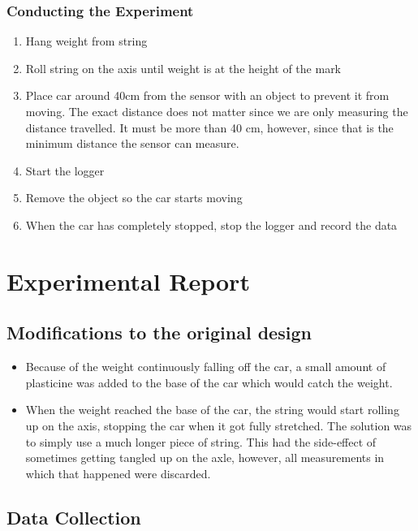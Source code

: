 \documentclass[titlepage,12pt]{article}
\begin{document}
\subsubsection{Conducting the Experiment}

\begin{enumerate}
    \item Hang weight from string
    \item Roll string on the axis until weight is at the height of the mark
    \item Place car around 40cm from the sensor with an object to prevent it from moving.
        The exact distance does not matter since we are only measuring the distance
        travelled. It must be more than 40 cm, however, since that is the minimum distance
        the sensor can measure.  
    \item Start the logger
    \item Remove the object so the car starts moving
    \item When the car has completely stopped, stop the logger and record the data
\end{enumerate}

\section{Experimental Report}

\subsection{Modifications to the original design}

\begin{itemize}
    \item Because of the weight continuously falling off the car, a small amount of
        plasticine was added to the base of the car which would catch the weight.

    \item When the weight reached the base of the car, the string would start rolling up on
        the axis, stopping the car when it got fully stretched. The solution was to simply
        use a much longer piece of string. This had the side-effect of sometimes getting
        tangled up on the axle, however, all measurements in which that happened were
        discarded.
\end{itemize}

\subsection{Data Collection}
\end{document}
